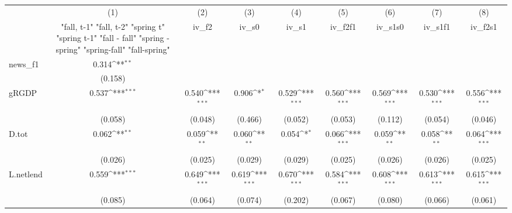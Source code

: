 {
\def\sym#1{\ifmmode^{#1}\else\(^{#1}\)\fi}
\begin{tabular}{l*{8}{c}}
\toprule
            &\multicolumn{1}{c}{(1)}&\multicolumn{1}{c}{(2)}&\multicolumn{1}{c}{(3)}&\multicolumn{1}{c}{(4)}&\multicolumn{1}{c}{(5)}&\multicolumn{1}{c}{(6)}&\multicolumn{1}{c}{(7)}&\multicolumn{1}{c}{(8)}\\
            &\multicolumn{1}{c}{  "fall, t-1" "fall, t-2" "spring t" "spring t-1"  "fall - fall" "spring - spring" "spring-fall" "fall-spring" }&\multicolumn{1}{c}{iv\_f2}&\multicolumn{1}{c}{iv\_s0}&\multicolumn{1}{c}{iv\_s1}&\multicolumn{1}{c}{iv\_f2f1}&\multicolumn{1}{c}{iv\_s1s0}&\multicolumn{1}{c}{iv\_s1f1}&\multicolumn{1}{c}{iv\_f2s1}\\
\midrule
news\_f1     &       0.314\sym{**} &                     &                     &                     &                     &                     &                     &                     \\
            &     (0.158)         &                     &                     &                     &                     &                     &                     &                     \\
\addlinespace
gRGDP       &       0.537\sym{***}&       0.540\sym{***}&       0.906\sym{*}  &       0.529\sym{***}&       0.560\sym{***}&       0.569\sym{***}&       0.530\sym{***}&       0.556\sym{***}\\
            &     (0.058)         &     (0.048)         &     (0.466)         &     (0.052)         &     (0.053)         &     (0.112)         &     (0.054)         &     (0.046)         \\
\addlinespace
D.tot       &       0.062\sym{**} &       0.059\sym{**} &       0.060\sym{**} &       0.054\sym{*}  &       0.066\sym{***}&       0.059\sym{**} &       0.058\sym{**} &       0.064\sym{***}\\
            &     (0.026)         &     (0.025)         &     (0.029)         &     (0.029)         &     (0.025)         &     (0.026)         &     (0.026)         &     (0.025)         \\
\addlinespace
L.netlend   &       0.559\sym{***}&       0.649\sym{***}&       0.619\sym{***}&       0.670\sym{***}&       0.584\sym{***}&       0.608\sym{***}&       0.613\sym{***}&       0.615\sym{***}\\
            &     (0.085)         &     (0.064)         &     (0.074)         &     (0.202)         &     (0.067)         &     (0.080)         &     (0.066)         &     (0.061)         \\

\end{tabular}}
